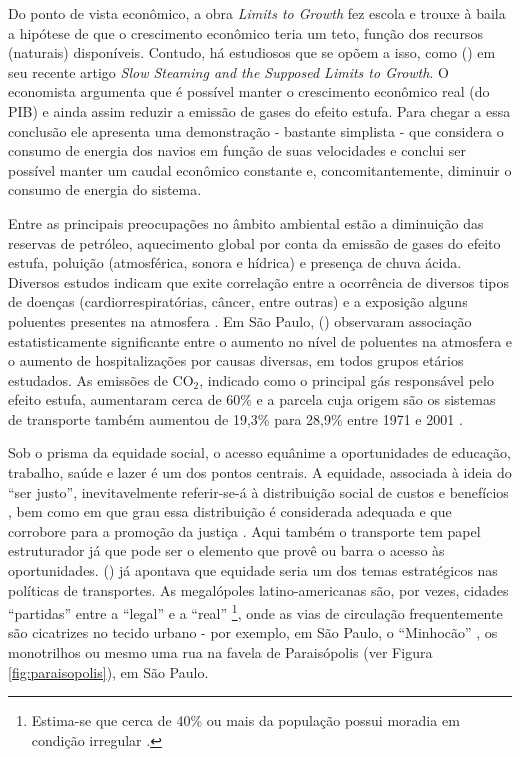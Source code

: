 Do ponto de vista econômico, a obra \emph{Limits to Growth} fez escola e trouxe à baila a hipótese de que o crescimento econômico teria um teto, função dos recursos (naturais) disponíveis. Contudo, há estudiosos que se opõem a isso, como  (\citeyear{KRUGMAN2014}) em seu recente artigo \emph{Slow Steaming and the Supposed Limits to Growth}. O economista argumenta que é possível manter o crescimento econômico real (do PIB) e ainda assim reduzir a emissão de gases do efeito estufa. Para chegar a essa conclusão ele apresenta uma demonstração - bastante simplista - que considera o consumo de energia dos navios em função de suas velocidades e conclui ser possível manter um caudal econômico constante e, concomitantemente, diminuir o consumo de energia do sistema.

Entre as principais preocupações no âmbito ambiental estão a diminuição das reservas de petróleo, aquecimento global por conta da emissão de gases do efeito estufa, poluição (atmosférica, sonora e hídrica) e presença de chuva ácida. Diversos estudos indicam que exite correlação entre a ocorrência de diversos tipos de doenças (cardiorrespiratórias, câncer, entre outras) e a exposição alguns poluentes presentes na atmosfera \cite{WHO2000,WHO2006,BRUNEKREEF2012,MIRANDA2012}. Em São Paulo,  (\citeyear{GOUVEIA2006}) observaram associação estatisticamente significante entre o aumento no nível de poluentes na atmosfera e o aumento de hospitalizações por causas diversas, em todos grupos etários estudados. As emissões de CO$_2$, indicado como o principal gás responsável pelo efeito estufa, aumentaram cerca de 60\% e a parcela cuja origem são os sistemas de transporte também aumentou de 19,3\% para 28,9\% entre 1971 e 2001 \cite{BANISTER2005}.

Sob o prisma da equidade social, o acesso equânime a oportunidades de educação, trabalho, saúde e lazer é um dos pontos centrais. A equidade, associada à ideia do ``ser justo'', inevitavelmente referir-se-á à distribuição social de custos e benefícios , bem como em que grau essa distribuição é considerada adequada e que corrobore para a promoção da justiça \cite{LITMAN2006}. Aqui também o transporte tem papel estruturador já que pode ser o elemento que provê ou barra o acesso às oportunidades.  (\citeyear{SANCHEZ2003}) já apontava que equidade seria um dos temas estratégicos nas políticas de transportes. As megalópoles latino-americanas são, por vezes, cidades ``partidas'' \cite{VENTURA2001} entre a ``legal'' e a ``real'' \cite{ALVA1997}
\footnote{Estima-se que cerca de 40\% ou mais da população possui moradia em condição irregular \cite{FREITAG2007}.},
onde as vias de circulação frequentemente são cicatrizes no tecido urbano - por exemplo, em São Paulo, o ``Minhocão'' \cite{ABASCAL2010}, os monotrilhos \cite{ROLNIK2010} ou mesmo uma rua na favela de Paraisópolis (ver Figura \ref{fig:paraisopolis}), em São Paulo.

